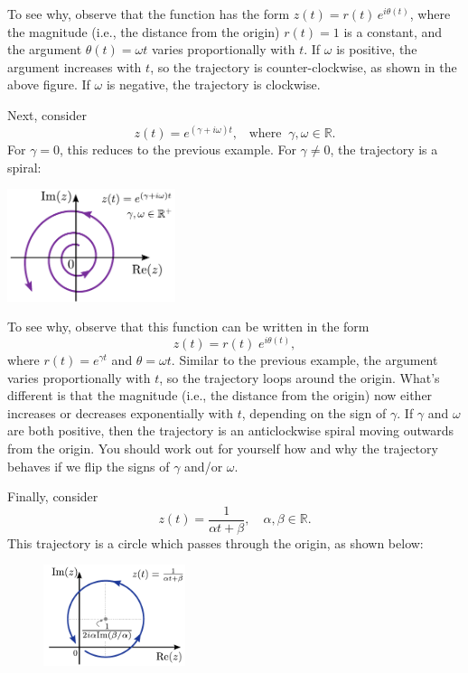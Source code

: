 \documentclass[10pt,a4paper]{article}
\begin{document}
\noindent
To see why, observe that the function has the form $z(t) =
r(t)\,e^{i\theta(t)}$, where the magnitude (i.e., the distance from
the origin) $r(t) = 1$ is a constant, and the argument $\theta(t) =
\omega t$ varies proportionally with $t$. If $\omega$ is positive, the
argument increases with $t$, so the trajectory is counter-clockwise,
as shown in the above figure. If $\omega$ is negative, the trajectory
is clockwise.

Next, consider
\begin{equation}
  z(t) = e^{(\gamma + i \omega) t}, \;\;\;\mathrm{where}\;\;
  \gamma,\omega \in \mathbb{R}.
\end{equation}
For $\gamma = 0$, this reduces to the previous example. For $\gamma
\ne 0$, the trajectory is a spiral:

{\centering
\includegraphics[width=0.37\textwidth]{complex_trajectory_2}\par
}

\noindent
To see why, observe that this function can be written in the form
\begin{equation}
  z(t) = r(t) \;e^{i\theta(t)},
\end{equation}
where $r(t) = e^{\gamma t}$ and $\theta = \omega t.$ Similar to the
previous example, the argument varies proportionally with $t$, so the
trajectory loops around the origin. What's different is that the
magnitude (i.e., the distance from the origin) now either increases or
decreases exponentially with $t$, depending on the sign of $\gamma$.
If $\gamma$ and $\omega$ are both positive, then the trajectory is
an anticlockwise spiral moving outwards from the origin. You should work
out for yourself how and why the trajectory behaves if we flip the signs
of $\gamma$ and/or $\omega$.
    
Finally, consider
\begin{equation}
  z(t) = \frac{1}{\alpha t + \beta}, \quad \alpha,\beta \in \mathbb{R}.
\end{equation}
This trajectory is a circle which passes through the origin, as shown
below:

\begin{figure}[h]
  \centering\includegraphics[width=0.37\textwidth]{complex_trajectory_3}
\end{figure}
\end{document}
